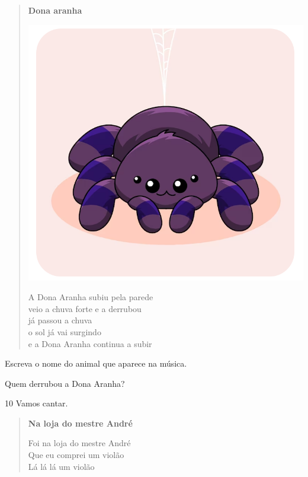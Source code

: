 \begin{myquote}
\begin{verse}
\begin{center}
\textbf{Dona aranha}

\noindent\includegraphics[width=.65\textwidth]{media/image185.png}
\end{center}
A Dona Aranha subiu pela parede\\
veio a chuva forte e a derrubou\\
já passou a chuva\\
o sol já vai surgindo\\
e a Dona Aranha continua a subir
\end{verse}

\end{myquote}

\begin{escolha}
\item Escreva o nome do animal que aparece na música.


\item Quem derrubou a Dona Aranha?


\end{escolha}

\num{10} Vamos cantar.

\begin{myquote}
\begin{verse}
\textbf{Na loja do mestre André}

Foi na loja do mestre André\\
Que eu comprei um violão\\
Lá lá lá um violão
\end{verse}
\end{myquote}

